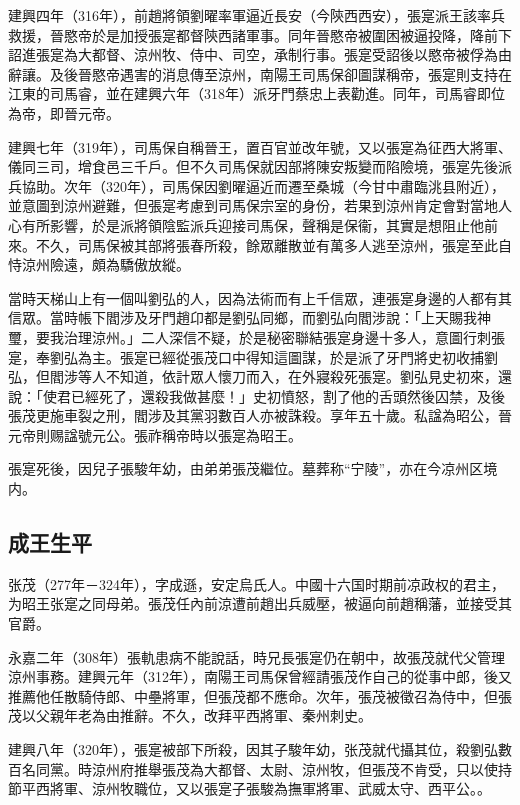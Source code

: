 建興四年（316年），前趙將領劉曜率軍逼近長安（今陝西西安），張寔派王該率兵救援，晉愍帝於是加授張寔都督陝西諸軍事。同年晉愍帝被圍困被逼投降，降前下詔進張寔為大都督、涼州牧、侍中、司空，承制行事。張寔受詔後以愍帝被俘為由辭讓。及後晉愍帝遇害的消息傳至涼州，南陽王司馬保卻圖謀稱帝，張寔則支持在江東的司馬睿，並在建興六年（318年）派牙門蔡忠上表勸進。同年，司馬睿即位為帝，即晉元帝。

建興七年（319年），司馬保自稱晉王，置百官並改年號，又以張寔為征西大將軍、儀同三司，增食邑三千戶。但不久司馬保就因部將陳安叛變而陷險境，張寔先後派兵協助。次年（320年），司馬保因劉曜逼近而遷至桑城（今甘中肅臨洮县附近），並意圖到涼州避難，但張寔考慮到司馬保宗室的身份，若果到涼州肯定會對當地人心有所影響，於是派將領陰監派兵迎接司馬保，聲稱是保衞，其實是想阻止他前來。不久，司馬保被其部將張春所殺，餘眾離散並有萬多人逃至涼州，張寔至此自恃涼州險遠，頗為驕傲放縱。

當時天梯山上有一個叫劉弘的人，因為法術而有上千信眾，連張寔身邊的人都有其信眾。當時帳下閻涉及牙門趙卬都是劉弘同鄉，而劉弘向閻涉說：「上天賜我神璽，要我治理涼州。」二人深信不疑，於是秘密聯結張寔身邊十多人，意圖行刺張寔，奉劉弘為主。張寔已經從張茂口中得知這圖謀，於是派了牙門將史初收捕劉弘，但閻涉等人不知道，依計眾人懷刀而入，在外寢殺死張寔。劉弘見史初來，還說：「使君已經死了，還殺我做甚麼！」史初憤怒，割了他的舌頭然後囚禁，及後張茂更施車裂之刑，閻涉及其黨羽數百人亦被誅殺。享年五十歲。私諡為昭公，晉元帝則赐諡號元公。張祚稱帝時以張寔為昭王。

張寔死後，因兒子張駿年幼，由弟弟張茂繼位。墓葬称“宁陵”，亦在今凉州区境内。


\subsection{成王生平}

张茂（277年－324年），字成遜，安定烏氏人。中國十六国时期前凉政权的君主，为昭王张寔之同母弟。張茂任內前涼遭前趙出兵威壓，被逼向前趙稱藩，並接受其官爵。

永嘉二年（308年）張軌患病不能說話，時兄長張寔仍在朝中，故張茂就代父管理涼州事務。建興元年（312年），南陽王司馬保曾經請張茂作自己的從事中郎，後又推薦他任散騎侍郎、中壘將軍，但張茂都不應命。次年，張茂被徵召為侍中，但張茂以父親年老為由推辭。不久，改拜平西將軍、秦州刺史。

建興八年（320年），張寔被部下所殺，因其子駿年幼，张茂就代攝其位，殺劉弘數百名同黨。時涼州府推舉張茂為大都督、太尉、涼州牧，但張茂不肯受，只以使持節平西將軍、涼州牧職位，又以張寔子張駿為撫軍將軍、武威太守、西平公。。

